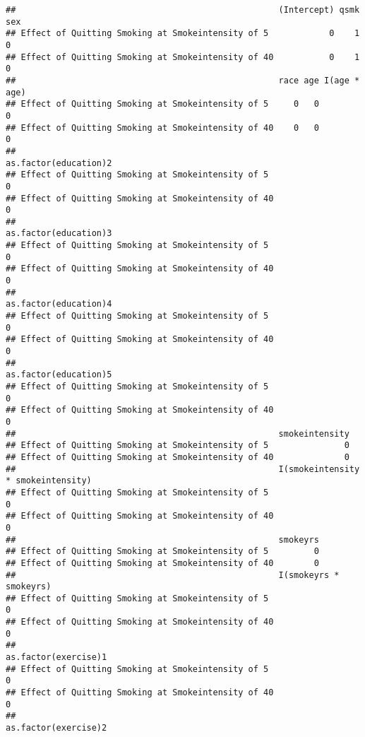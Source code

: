 \documentclass[10pt,]{book}
\begin{document}
\begin{verbatim}
##                                                    (Intercept) qsmk sex
## Effect of Quitting Smoking at Smokeintensity of 5            0    1   0
## Effect of Quitting Smoking at Smokeintensity of 40           0    1   0
##                                                    race age I(age * age)
## Effect of Quitting Smoking at Smokeintensity of 5     0   0            0
## Effect of Quitting Smoking at Smokeintensity of 40    0   0            0
##                                                    as.factor(education)2
## Effect of Quitting Smoking at Smokeintensity of 5                      0
## Effect of Quitting Smoking at Smokeintensity of 40                     0
##                                                    as.factor(education)3
## Effect of Quitting Smoking at Smokeintensity of 5                      0
## Effect of Quitting Smoking at Smokeintensity of 40                     0
##                                                    as.factor(education)4
## Effect of Quitting Smoking at Smokeintensity of 5                      0
## Effect of Quitting Smoking at Smokeintensity of 40                     0
##                                                    as.factor(education)5
## Effect of Quitting Smoking at Smokeintensity of 5                      0
## Effect of Quitting Smoking at Smokeintensity of 40                     0
##                                                    smokeintensity
## Effect of Quitting Smoking at Smokeintensity of 5               0
## Effect of Quitting Smoking at Smokeintensity of 40              0
##                                                    I(smokeintensity * smokeintensity)
## Effect of Quitting Smoking at Smokeintensity of 5                                   0
## Effect of Quitting Smoking at Smokeintensity of 40                                  0
##                                                    smokeyrs
## Effect of Quitting Smoking at Smokeintensity of 5         0
## Effect of Quitting Smoking at Smokeintensity of 40        0
##                                                    I(smokeyrs * smokeyrs)
## Effect of Quitting Smoking at Smokeintensity of 5                       0
## Effect of Quitting Smoking at Smokeintensity of 40                      0
##                                                    as.factor(exercise)1
## Effect of Quitting Smoking at Smokeintensity of 5                     0
## Effect of Quitting Smoking at Smokeintensity of 40                    0
##                                                    as.factor(exercise)2

\end{verbatim}
\end{document}
